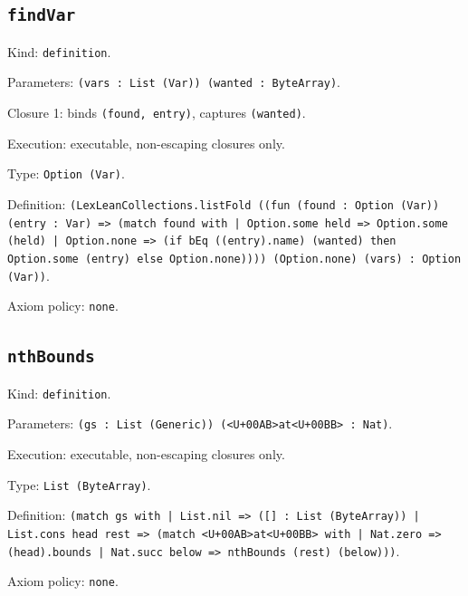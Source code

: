 \documentclass[11pt]{article}
\begin{document}
\subsection*{\texttt{findVar}}
\noindent Kind: \texttt{definition}.\par
\noindent Parameters: \texttt{(vars : List (Var)) (wanted : ByteArray)}.\par
\noindent Closure 1: binds \texttt{(found, entry)}, captures \texttt{(wanted)}.\par
\noindent Execution: executable, non-escaping closures only.\par
\noindent Type: \texttt{Option (Var)}.\par
\noindent Definition: \texttt{(LexLeanCollections.listFold ((fun (found : Option (Var)) (entry : Var) => (match found with | Option.some held => Option.some (held) | Option.none => (if bEq ((entry).name) (wanted) then Option.some (entry) else Option.none)))) (Option.none) (vars) : Option (Var))}.\par
\noindent Axiom policy: \texttt{none}.\par
\subsection*{\texttt{nthBounds}}
\noindent Kind: \texttt{definition}.\par
\noindent Parameters: \texttt{(gs : List (Generic)) (<U+00AB>at<U+00BB> : Nat)}.\par
\noindent Execution: executable, non-escaping closures only.\par
\noindent Type: \texttt{List (ByteArray)}.\par
\noindent Definition: \texttt{(match gs with | List.nil => ([] : List (ByteArray)) | List.cons head rest => (match <U+00AB>at<U+00BB> with | Nat.zero => (head).bounds | Nat.succ below => nthBounds (rest) (below)))}.\par
\noindent Axiom policy: \texttt{none}.\par
\end{document}
